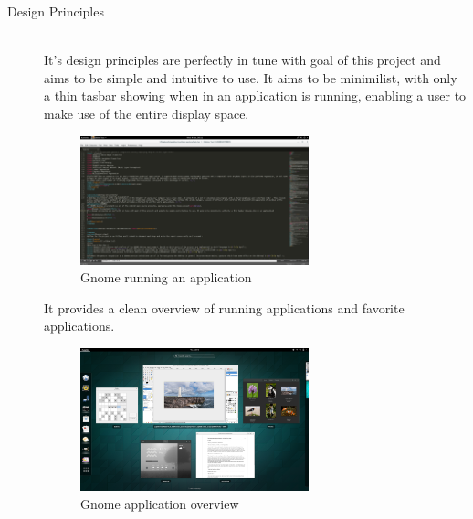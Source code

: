 \documentclass[a4paper]{article}
\begin{document}
\begin{description}
\item[Design Principles]{\hfill \\
It's design principles are perfectly in tune with goal of this project and aims to be simple and intuitive to use. It aims to be minimilist, with only a thin tasbar showing when in an application is running, enabling a user to make use of the entire display space.

\begin{figure}[!h]
\centerline{\includegraphics[width=0.65\textwidth]{Gnome.png}}
\caption{Gnome running an application}
\end{figure}

It provides a clean overview of running applications and favorite applications.
\begin{figure}[!h]
\centerline{\includegraphics[width=0.65\textwidth]{activities-overview1.png}}
\caption{Gnome application overview \cite{Gnome 3}}
\end{figure}
}


\end{description}
\end{document}
